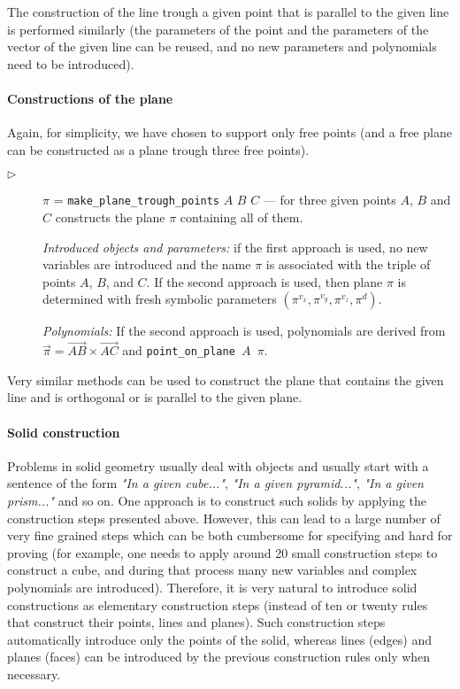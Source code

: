 \documentclass[final,1p,times,authoryear]{elsarticle}
\begin{document}
The construction of the line trough a given point that is parallel to
the given line is performed similarly (the parameters of the point and
the parameters of the vector of the given line can be reused, and no
new parameters and polynomials need to be introduced).


\paragraph{Constructions of the plane}
Again, for simplicity, we have chosen to support only free points (and
a free plane can be constructed as a plane trough three free points).

\begin{description}
\item[$\triangleright$] $\pi$ = {\tt make\_plane\_trough\_points} $A$
  $B$ $C$ --- for three given points $A$, $B$ and $C$ constructs the
  plane $\pi$ containing all of them.

  {\em Introduced objects and parameters:} if the first approach is
  used, no new variables are introduced and the name $\pi$ is
  associated with the triple of points $A$, $B$, and $C$. If the
  second approach is used, then plane $\pi$ is determined with fresh
  symbolic parameters $(\pi^{v_x}, \pi^{v_y}, \pi^{v_z}, \pi^{d})$.

  {\em Polynomials:} If the second approach is used, polynomials are
  derived from
  $\overrightarrow{\pi} = \overrightarrow{AB} \times
  \overrightarrow{AC}$ and {\tt point\_on\_plane $A$ $\pi$}.
\end{description}


Very similar methods can be used to construct the plane that contains
the given line and is orthogonal or is parallel to the given plane.

\paragraph{Solid construction}
\label{objectconstruction}

Problems in solid geometry usually deal with objects and usually start
with a sentence of the form {\em "In a given cube..."}, {\em "In a
  given pyramid..."}, {\em "In a given prism..."} and so on. One
approach is to construct such solids by applying the construction
steps presented above. However, this can lead to a large number of
very fine grained steps which can be both cumbersome for specifying
and hard for proving (for example, one needs to apply around 20 small
construction steps to construct a cube, and during that process many
new variables and complex polynomials are introduced). Therefore, it
is very natural to introduce solid constructions as elementary
construction steps (instead of ten or twenty rules that construct
their points, lines and planes). Such construction steps automatically
introduce only the points of the solid, whereas lines (edges) and
planes (faces) can be introduced by the previous construction rules
only when necessary.
\end{document}
